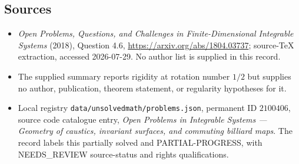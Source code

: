 \documentclass[11pt]{article}
\begin{document}
\subsection{Sources}
\begin{itemize}
\item \emph{Open Problems, Questions, and Challenges in Finite-Dimensional Integrable Systems} (2018), Question 4.6, \url{https://arxiv.org/abs/1804.03737}; source-TeX extraction, accessed 2026-07-29. No author list is supplied in this record.
\item The supplied summary reports rigidity at rotation number $1/2$ but supplies no author, publication, theorem statement, or regularity hypotheses for it.
\item Local registry \texttt{data/unsolvedmath/problems.json}, permanent ID $2100406$, source code catalogue entry, \emph{Open Problems in Integrable Systems --- Geometry of caustics, invariant surfaces, and commuting billiard maps}. The record labels this partially solved and PARTIAL-PROGRESS, with NEEDS\_REVIEW source-status and rights qualifications.
\end{itemize}
\end{document}
